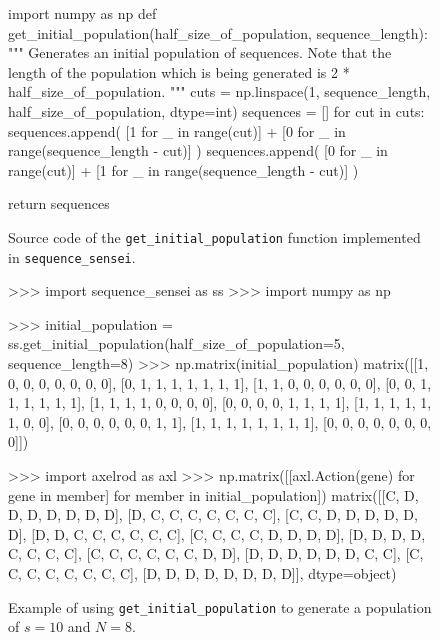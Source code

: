 \begin{figure}[!htbp]
\begin{sourcepy}
import numpy as np
def get_initial_population(half_size_of_population, sequence_length):
    """
    Generates an initial population of sequences. Note that the length
    of the population which is being generated is 2 * half_size_of_population.
    """
    cuts = np.linspace(1, sequence_length, half_size_of_population, dtype=int)
    sequences = []
    for cut in cuts:
        sequences.append(
            [1 for _ in range(cut)] + [0 for _ in range(sequence_length - cut)]
        )
        sequences.append(
            [0 for _ in range(cut)] + [1 for _ in range(sequence_length - cut)]
        )

    return sequences
\end{sourcepy}
\caption{Source code of the \texttt{get_initial_population} function
implemented in \texttt{sequence_sensei}.}\label{fig:get_initial_population}
\end{figure}

\begin{figure}[!htbp]
    \begin{usagepy}
>>> import sequence_sensei as ss
>>> import numpy as np

>>> initial_population = ss.get_initial_population(half_size_of_population=5, sequence_length=8)
>>> np.matrix(initial_population)
matrix([[1, 0, 0, 0, 0, 0, 0, 0],
        [0, 1, 1, 1, 1, 1, 1, 1],
        [1, 1, 0, 0, 0, 0, 0, 0],
        [0, 0, 1, 1, 1, 1, 1, 1],
        [1, 1, 1, 1, 0, 0, 0, 0],
        [0, 0, 0, 0, 1, 1, 1, 1],
        [1, 1, 1, 1, 1, 1, 0, 0],
        [0, 0, 0, 0, 0, 0, 1, 1],
        [1, 1, 1, 1, 1, 1, 1, 1],
        [0, 0, 0, 0, 0, 0, 0, 0]])

>>> import axelrod as axl
>>> np.matrix([[axl.Action(gene) for gene in member] for member in initial_population])
matrix([[C, D, D, D, D, D, D, D],
        [D, C, C, C, C, C, C, C],
        [C, C, D, D, D, D, D, D],
        [D, D, C, C, C, C, C, C],
        [C, C, C, C, D, D, D, D],
        [D, D, D, D, C, C, C, C],
        [C, C, C, C, C, C, D, D],
        [D, D, D, D, D, D, C, C],
        [C, C, C, C, C, C, C, C],
        [D, D, D, D, D, D, D, D]], dtype=object)

\end{usagepy}
\caption{Example of using \texttt{get_initial_population} to
generate a population of \(s=10\) and \(N=8\).}\label{fig:get_initial_population_example}
\end{figure}

